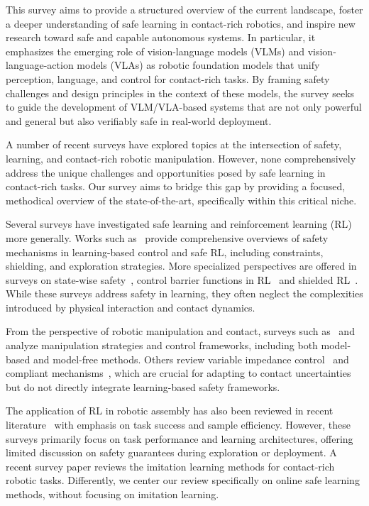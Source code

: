 \documentclass[Afour,sageh,times]{template/sagej}
\newcommand{\suggest}[1]{{\color{olive} (#1)}}
\begin{document}
This survey aims to provide a structured overview of the current landscape, foster a deeper understanding of safe learning in contact-rich robotics, and inspire new research toward safe and capable autonomous systems. In particular, it emphasizes the emerging role of vision-language models (VLMs) and vision-language-action models (VLAs) as robotic foundation models that unify perception, language, and control for contact-rich tasks. By framing safety challenges and design principles in the context of these models, the survey seeks to guide the development of VLM/VLA-based systems that are not only powerful and general but also verifiably safe in real-world deployment.

A number of recent surveys have explored topics at the intersection of safety, learning, and contact-rich robotic manipulation. However, none comprehensively address the unique challenges and opportunities posed by safe learning in contact-rich tasks. Our survey aims to bridge this gap by providing a focused, methodical overview of the state-of-the-art, specifically within this critical niche.

Several surveys have investigated safe learning and reinforcement learning (RL) more generally. Works such as~\citep{brunke2022safe,zhao2023state,gu2024review} provide comprehensive overviews of safety mechanisms in learning-based control and safe RL, including constraints, shielding, and exploration strategies. More specialized perspectives are offered in surveys on state-wise safety~\citep{zhao2023state}, control barrier functions in RL~\citep{guerrier2024learning} and shielded RL~\citep{odriozola2023shielded}. While these surveys address safety in learning, they often neglect the complexities introduced by physical interaction and contact dynamics.

From the perspective of robotic manipulation and contact, surveys such as~\citep{suomalainen2022survey,kroemer2021review} and ~\citep{xu2019compare} analyze manipulation strategies and control frameworks, including both model-based and model-free methods. Others review variable impedance control~\citep{abu2020variable} and compliant mechanisms~\citep{samadikhoshkho2024review}, which are crucial for adapting to contact uncertainties but do not directly integrate learning-based safety frameworks.

The application of RL in robotic assembly has also been reviewed in recent literature~\citep{stan2020reinforcement,elguea2023review,das2025towards} with emphasis on task success and sample efficiency. However, these surveys primarily focus on task performance and learning architectures, offering limited discussion on safety guarantees during exploration or deployment. 
A recent survey paper \citep{Tsuji2025asu} reviews the imitation learning methods for contact-rich robotic tasks. 
Differently, we center our review specifically on online safe learning methods, without focusing on imitation learning.
\end{document}
